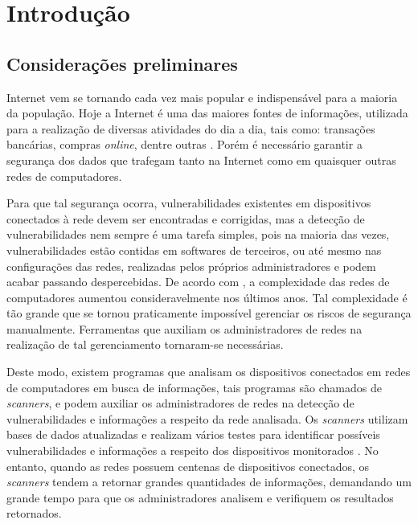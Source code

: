 \chapter{Introdução}
\label{cap:introducao}


\section{Considerações preliminares}

Internet vem se tornando cada vez mais popular e indispensável para a maioria da população. Hoje a Internet é uma das maiores fontes de informações, utilizada para a realização de diversas atividades do dia a dia, tais como: transações bancárias, compras \textit{online}, dentre outras \cite{fischer2014cybersecurity}. Porém  é necessário garantir a segurança dos dados que trafegam tanto na Internet como em quaisquer outras redes de computadores.

Para que tal segurança ocorra, vulnerabilidades existentes em dispositivos conectados à rede devem ser encontradas e corrigidas, mas a detecção de vulnerabilidades nem sempre é uma tarefa simples, pois na maioria das vezes, vulnerabilidades estão contidas em softwares de terceiros, ou até mesmo nas configurações das redes, realizadas pelos próprios administradores e podem acabar passando despercebidas.
De acordo com , a complexidade das redes de computadores aumentou consideravelmente nos últimos anos. Tal complexidade é tão grande que se tornou praticamente impossível gerenciar os riscos de segurança manualmente. Ferramentas que auxiliam os administradores de redes na realização de tal gerenciamento tornaram-se necessárias.

Deste modo, existem programas que analisam os dispositivos conectados em redes de computadores em busca de informações, tais programas são chamados de \textit{scanners}, e podem auxiliar os administradores de redes na detecção de vulnerabilidades e informações a respeito da rede analisada. Os \textit{scanners} utilizam bases de dados atualizadas e realizam vários testes para identificar possíveis vulnerabilidades e informações a respeito dos dispositivos monitorados \cite{weidman2014penetration}. No entanto, quando as redes possuem centenas de dispositivos conectados, os \textit{scanners} tendem a retornar grandes quantidades de informações, demandando um grande tempo para que os administradores analisem e verifiquem os resultados retornados.

